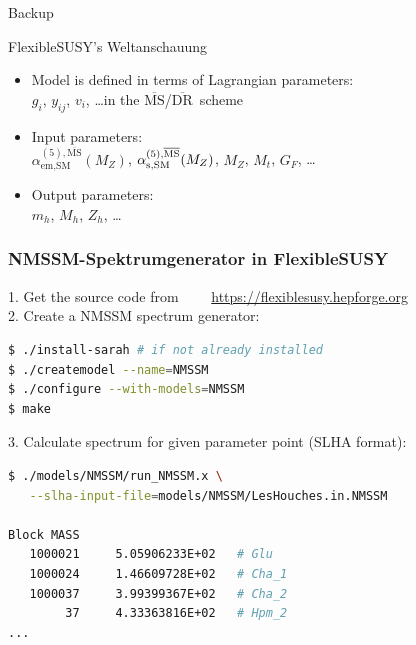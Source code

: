 \documentclass[hyperref={pdfpagelabels=false},ngerman]{beamer}
\newcommand{\DRbar}{\ensuremath{\overline{\text{DR}}}}
\newcommand{\MSbar}{\ensuremath{\overline{\text{MS}}}}
\begin{document}

\begin{frame}[noframenumbering]
  \begin{center}
    \Huge Backup
  \end{center}
\end{frame}

\begin{frame}[noframenumbering]{FlexibleSUSY's Weltanschauung}
  \begin{itemize} \setlength\itemsep{2em}
  \item Model is defined in terms of Lagrangian parameters:\\
    $g_i$, $y_{ij}$, $v_i$, \ldots in the \MSbar/\DRbar\ scheme
  \item Input parameters:\\
    $\alpha_{\text{em},\text{SM}}^{(5),\MSbar}(M_Z)$,
    $\alpha_{\text{s},\text{SM}}^{(5),\text{\MSbar}}(M_Z)$, $M_Z$,
    $M_t$, $G_F$, \ldots
  \item Output parameters:\\ $m_h$, $M_h$, $Z_h$, \ldots
  \end{itemize}
\end{frame}

\begin{frame}
  \frametitle{NMSSM-Spektrumgenerator in FlexibleSUSY}
  1. Get the source code from \ \ \ \
  \href{https://flexiblesusy.hepforge.org}{https://flexiblesusy.hepforge.org}\\
  \vspace{0.5em}
  2. Create a NMSSM spectrum generator:
  \begin{lstlisting}[language=bash]
$ ./install-sarah # if not already installed
$ ./createmodel --name=NMSSM
$ ./configure --with-models=NMSSM
$ make
  \end{lstlisting} %
  \vspace{0.5em}
  3. Calculate spectrum for given parameter point (SLHA format):
  \begin{lstlisting}[language=bash]
$ ./models/NMSSM/run_NMSSM.x \
   --slha-input-file=models/NMSSM/LesHouches.in.NMSSM

Block MASS
   1000021     5.05906233E+02   # Glu
   1000024     1.46609728E+02   # Cha_1
   1000037     3.99399367E+02   # Cha_2
        37     4.33363816E+02   # Hpm_2
...
  \end{lstlisting} %
\end{frame}
\end{document}
